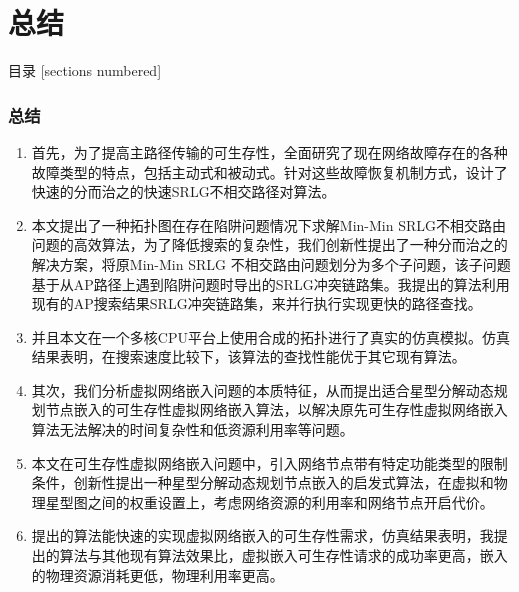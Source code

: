 ﻿\section{总结}
\begin{frame}{目录}
[sections numbered]
\end{frame}
\addtocounter{framenumber}{-1}  %

\begin{frame}
\frametitle{总结}
\begin{enumerate}
  \item 首先，为了提高主路径传输的可生存性，全面研究了现在网络故障存在的各种故障类型的特点，包括主动式和被动式。针对这些故障恢复机制方式，设计了快速的分而治之的快速SRLG不相交路径对算法。
  \item 本文提出了一种拓扑图在存在陷阱问题情况下求解Min-Min SRLG不相交路由问题的高效算法，为了降低搜索的复杂性，我们创新性提出了一种分而治之的解决方案，将原Min-Min SRLG 不相交路由问题划分为多个子问题，该子问题基于从AP路径上遇到陷阱问题时导出的SRLG冲突链路集。我提出的算法利用现有的AP搜索结果SRLG冲突链路集，来并行执行实现更快的路径查找。
  \item 并且本文在一个多核CPU平台上使用合成的拓扑进行了真实的仿真模拟。仿真结果表明，在搜索速度比较下，该算法的查找性能优于其它现有算法。
  \item 其次，我们分析虚拟网络嵌入问题的本质特征，从而提出适合星型分解动态规划节点嵌入的可生存性虚拟网络嵌入算法，以解决原先可生存性虚拟网络嵌入算法无法解决的时间复杂性和低资源利用率等问题。
  \item 本文在可生存性虚拟网络嵌入问题中，引入网络节点带有特定功能类型的限制条件，创新性提出一种星型分解动态规划节点嵌入的启发式算法，在虚拟和物理星型图之间的权重设置上，考虑网络资源的利用率和网络节点开启代价。
  \item   提出的算法能快速的实现虚拟网络嵌入的可生存性需求，仿真结果表明，我提出的算法与其他现有算法效果比，虚拟嵌入可生存性请求的成功率更高，嵌入的物理资源消耗更低，物理利用率更高。
\end{enumerate}
\end{frame}
